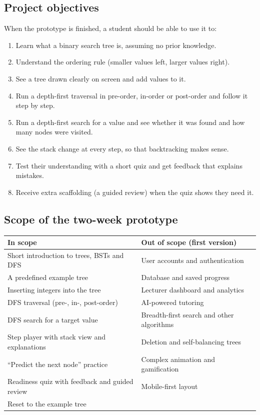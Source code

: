 \documentclass[11pt,a4paper]{article}
\begin{document}
\subsection{Project objectives}

When the prototype is finished, a student should be able to use it to:

\begin{enumerate}
  \item Learn what a binary search tree is, assuming no prior knowledge.
  \item Understand the ordering rule (smaller values left, larger values right).
  \item See a tree drawn clearly on screen and add values to it.
  \item Run a depth-first traversal in pre-order, in-order or post-order and follow it step by step.
  \item Run a depth-first search for a value and see whether it was found and how many nodes
        were visited.
  \item See the stack change at every step, so that backtracking makes sense.
  \item Test their understanding with a short quiz and get feedback that explains mistakes.
  \item Receive extra scaffolding (a guided review) when the quiz shows they need it.
\end{enumerate}

\subsection{Scope of the two-week prototype}

\begin{tabularx}{\textwidth}{@{}L L@{}}
  \toprule
  \textbf{In scope} & \textbf{Out of scope (first version)} \\
  \midrule
  Short introduction to trees, BSTs and DFS & User accounts and authentication \\
  A predefined example tree & Database and saved progress \\
  Inserting integers into the tree & Lecturer dashboard and analytics \\
  DFS traversal (pre-, in-, post-order) & AI-powered tutoring \\
  DFS search for a target value & Breadth-first search and other algorithms \\
  Step player with stack view and explanations & Deletion and self-balancing trees \\
  ``Predict the next node'' practice & Complex animation and gamification \\
  Readiness quiz with feedback and guided review & Mobile-first layout \\
  Reset to the example tree & \\
  \bottomrule
\end{tabularx}
\end{document}

